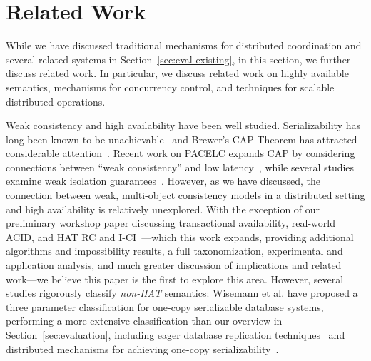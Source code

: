 
\section{Related Work}
\label{sec:relatedwork}

While we have discussed traditional mechanisms for distributed
coordination and several related systems in
Section~\ref{sec:eval-existing}, in this section, we further discuss
related work. In particular, we discuss related work on highly
available semantics, mechanisms for concurrency control, and
techniques for scalable distributed operations.

Weak consistency and high availability have been well
studied. Serializability has long been known to be
unachievable~\cite{davidson-survey} and Brewer's CAP Theorem has
attracted considerable attention~\cite{gilbert-cap}. Recent work on
PACELC expands CAP by considering connections between ``weak
consistency'' and low latency~\cite{abadi-pacelc}, while several
studies examine weak isolation guarantees~\cite{adya,
  ansicritique}. However, as we have discussed, the connection between
weak, multi-object consistency models in a distributed setting and
high availability is relatively unexplored. With the exception of our
preliminary workshop paper discussing transactional availability,
real-world ACID, and HAT RC and I-CI~\cite{hat-hotos}---which this
work expands, providing additional algorithms and impossibility
results, a full taxonomization, experimental and application analysis,
and much greater discussion of implications and related work---we
believe this paper is the first to explore this area. However, several
studies rigorously classify \textit{non-HAT} semantics: Wisemann et
al. have proposed a three parameter classification for one-copy
serializable database systems, performing a more extensive
classification than our overview in Section~\ref{sec:evaluation},
including eager database replication
techniques~\cite{kemme-classification} and distributed mechanisms for
achieving one-copy serializability~\cite{wisemann-survey}.


